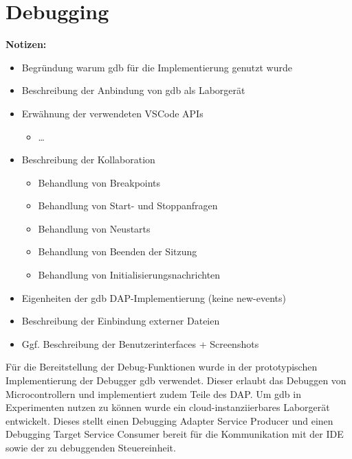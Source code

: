 \section{Debugging}\label{section:prototypische-implementierung:debugging}

\begin{note}
    \textbf{Notizen:}
    \begin{itemize}
        \item Begründung warum gdb für die Implementierung genutzt wurde
        \item Beschreibung der Anbindung von gdb als Laborgerät
        \item Erwähnung der verwendeten VSCode APIs
              \begin{itemize}
                  \item \dots
              \end{itemize}
        \item Beschreibung der Kollaboration
              \begin{itemize}
                  \item Behandlung von Breakpoints
                  \item Behandlung von Start- und Stoppanfragen
                  \item Behandlung von Neustarts
                  \item Behandlung von Beenden der Sitzung
                  \item Behandlung von Initialisierungsnachrichten
              \end{itemize}
        \item Eigenheiten der gdb DAP-Implementierung (keine new-events)
        \item Beschreibung der Einbindung externer Dateien
        \item Ggf. Beschreibung der Benutzerinterfaces + Screenshots
    \end{itemize}
\end{note}

Für die Bereitstellung der Debug-Funktionen wurde in der prototypischen Implementierung der Debugger gdb  verwendet. Dieser erlaubt das Debuggen von Microcontrollern und implementiert zudem Teile des \ac{DAP}. Um gdb in Experimenten nutzen zu können wurde ein cloud-instanziierbares Laborgerät entwickelt. Dieses stellt einen Debugging Adapter Service Producer und einen Debugging Target Service Consumer bereit für die Kommunikation mit der IDE sowie der zu debuggenden Steuereinheit.


